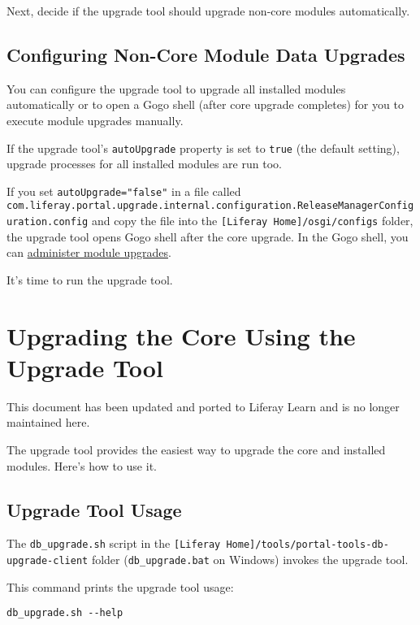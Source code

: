 Next, decide if the upgrade tool should upgrade non-core modules
automatically.

\section{Configuring Non-Core Module Data
Upgrades}\label{configuring-non-core-module-data-upgrades}

You can configure the upgrade tool to upgrade all installed modules
automatically or to open a Gogo shell (after core upgrade completes) for
you to execute module upgrades manually.

If the upgrade tool's \texttt{autoUpgrade} property is set to
\texttt{true} (the default setting), upgrade processes for all installed
modules are run too.

If you set \texttt{autoUpgrade="false"} in a file called
\texttt{com.liferay.portal.upgrade.internal.configuration.ReleaseManagerConfiguration.config}
and copy the file into the \texttt{{[}Liferay\ Home{]}/osgi/configs}
folder, the upgrade tool opens Gogo shell after the core upgrade. In the
Gogo shell, you can
\href{/docs/7-2/deploy/-/knowledge_base/d/upgrading-modules-using-gogo-shell}{administer
module upgrades}.

It's time to run the upgrade tool.

\chapter{Upgrading the Core Using the Upgrade
Tool}\label{upgrading-the-core-using-the-upgrade-tool}

{This document has been updated and ported to Liferay Learn and is no
longer maintained here.}

The upgrade tool provides the easiest way to upgrade the core and
installed modules. Here's how to use it.

\section{Upgrade Tool Usage}\label{upgrade-tool-usage}

The \texttt{db\_upgrade.sh} script in the
\texttt{{[}Liferay\ Home{]}/tools/portal-tools-db-upgrade-client} folder
(\texttt{db\_upgrade.bat} on Windows) invokes the upgrade tool.

This command prints the upgrade tool usage:

\begin{verbatim}
db_upgrade.sh --help
\end{verbatim}

